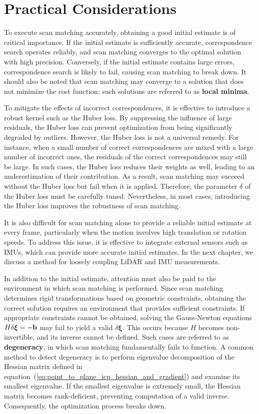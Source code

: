 \section{Practical Considerations}
\label{sec:scan_matching_実用にあたって}

To execute scan matching accurately, obtaining a good initial estimate is of critical importance.
If the initial estimate is sufficiently accurate, correspondence search operates reliably, and scan matching converges to the optimal solution with high precision.
Conversely, if the initial estimate contains large errors, correspondence search is likely to fail, causing scan matching to break down.
It should also be noted that scan matching may converge to a solution that does not minimize the cost function; such solutions are referred to as {\bf local minima}.

To mitigate the effects of incorrect correspondences, it is effective to introduce a robust kernel such as the Huber loss.
By suppressing the influence of large residuals, the Huber loss can prevent optimization from being significantly degraded by outliers.
However, the Huber loss is not a universal remedy.
For instance, when a small number of correct correspondences are mixed with a large number of incorrect ones, the residuals of the correct correspondences may still be large.
In such cases, the Huber loss reduces their weights as well, leading to an underestimation of their contribution.
As a result, scan matching may succeed without the Huber loss but fail when it is applied.
Therefore, the parameter $\delta$ of the Huber loss must be carefully tuned.
Nevertheless, in most cases, introducing the Huber loss improves the robustness of scan matching.

It is also difficult for scan matching alone to provide a reliable initial estimate at every frame, particularly when the motion involves high translation or rotation speeds.
To address this issue, it is effective to integrate external sensors such as IMUs, which can provide more accurate initial estimates.
In the next chapter, we discuss a method for loosely coupling LiDAR and IMU measurements.

In addition to the initial estimate, attention must also be paid to the environment in which scan matching is performed.
Since scan matching determines rigid transformations based on geometric constraints, obtaining the correct solution requires an environment that provides sufficient constraints.
If appropriate constraints cannot be obtained, solving the Gauss-Newton equations $H \delta \boldsymbol{\xi} = -{\bf b}$ may fail to yield a valid $\delta \boldsymbol{\xi}$.
This occurs because $H$ becomes non-invertible, and its inverse cannot be defined.
Such cases are referred to as {\bf degeneracy}, in which scan matching fundamentally fails to function.
A common method to detect degeneracy is to perform eigenvalue decomposition of the Hessian matrix defined in equation~(\ref{eq:point_to_plane_icp_hessian_and_gradient}) and examine its smallest eigenvalue.
If the smallest eigenvalue is extremely small, the Hessian matrix becomes rank-deficient, preventing computation of a valid inverse.
Consequently, the optimization process breaks down.


